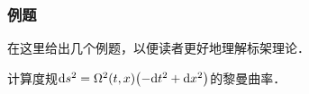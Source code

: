 




\subsubsection{例题}
在这里给出几个例题，以便读者更好地理解标架理论．
\begin{example}
计算度规${\rm d}s^2= \Omega^{2}(t,x) \bigl(-{\rm d}t^2 + {\rm d}x^2\bigr) $的黎曼曲率．
\end{example}

